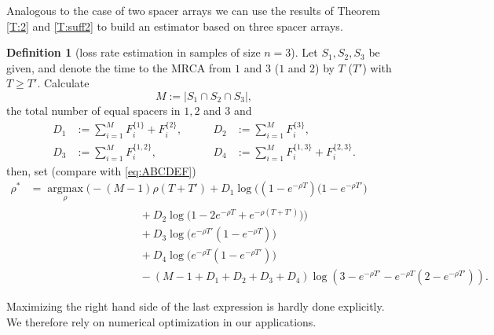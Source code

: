 \documentclass[preprint,authoryear]{elsarticle}
\theoremstyle{definition}
\newtheorem{definition}[proposition]{Definition}
\numberwithin{equation}{section}
\numberwithin{figure}{section}
\begin{document}
Analogous to the case of two spacer arrays we can use the results of
Theorem \ref{T:2} and \ref{T:suff2} to build an estimator based on three spacer arrays.

\begin{definition}[loss rate estimation in samples of size
  $n=3$]\label{alg:2}
  Let $S_{\mathfrak 1}, S_{\mathfrak 2}, S_{\mathfrak 3}$ be given,
  and denote the time to the MRCA from $\mathfrak 1$ and $\mathfrak 3$
  ($\mathfrak 1$ and $\mathfrak 2$) by $T$ ($T'$) with $T\geq T'$.
  Calculate
  $$ M:=|S_{\mathfrak 1} \cap S_{\mathfrak 2} \cap S_{\mathfrak 3}|,$$
  the total number of equal spacers in $\mathfrak 1, \mathfrak 2$ and
  $\mathfrak 3$ and
  \begin{align*}
    D_1 & := \sum_{i=1}^M F_i^{\{\mathfrak 1\}} + F_i^{\{\mathfrak 2\}}, \qquad  
    & D_2 & := \sum_{i=1}^M F_i^{\{\mathfrak 3\}}, 
    \\ D_3 & := \sum_{i=1}^M F_i^{\{\mathfrak 1, \mathfrak 2\}}, \qquad  
    & D_4 & := \sum_{i=1}^M F_i^{\{\mathfrak 1, \mathfrak 3\}} + F_i^{\{\mathfrak 2, \mathfrak 3\}}.
  \end{align*}
  then, set (compare with \eqref{eq:ABCDEF})
  \begin{align*}
    \rho^\ast & = \mathop{argmax}\limits_{\rho} 
                \Big(- (M-1) \rho (T+T') 
                + D_1 \log\big((1-e^{-\rho
                T})(1-e^{-\rho T'}\big)
    \\ & \qquad \qquad \qquad \qquad \qquad 
         + D_2 \log\big(1-2e^{-\rho T} + e^{-\rho 
         (T+T')})\big)
    \\ & \qquad \qquad \qquad \qquad \qquad 
         +D_3\log\big(e^{-\rho T'}(1-
         e^{-\rho T})\big)
    \\ & \qquad \qquad \qquad \qquad \qquad 
         + D_4 \log\big(e^{-\rho
         T}(1- e^{-\rho T'})\big)
    \\ & \qquad \qquad \qquad \qquad \qquad 
         - (M-1+D_1+D_2+D_3+D_4) \log(3 - e^{-\rho T'} - e^{-\rho T}(2-e^{-\rho T'})).
  \end{align*}
\end{definition}

\noindent
Maximizing the right hand side of the last expression is hardly done
explicitly. We therefore rely on numerical optimization in our
applications.
\end{document}

